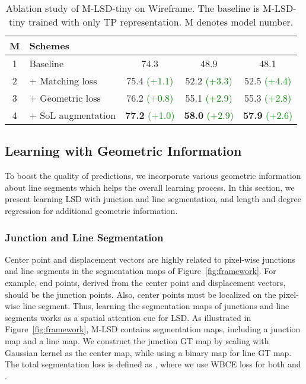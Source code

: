 \documentclass[letterpaper]{article} \usepackage{aaai22}  \usepackage{times}  \usepackage{helvet}  \usepackage{courier}  \usepackage[hyphens]{url}  \usepackage{graphicx} \urlstyle{rm} \def\UrlFont{\rm}  \usepackage{natbib}  \usepackage{caption} \DeclareCaptionStyle{ruled}{labelfont=normalfont,labelsep=colon,strut=off} \frenchspacing  \setlength{\pdfpagewidth}{8.5in}  \setlength{\pdfpageheight}{11in}  \usepackage{algorithm}
\begin{document}
\begin{table}[t!]
\centering
\begin{adjustbox}{width=1.0\columnwidth,center}
\begin{tabular}{clccc}
\toprule
M & Schemes                &  &  &  \\
\midrule
1 & Baseline    &   74.3   & 48.9  &  48.1  \\
2 & + Matching loss  &   75.4 \textcolor{Green}{(+1.1)}  & 52.2 \textcolor{Green}{(+3.3)}  &  52.5 \textcolor{Green}{(+4.4)} \\
3 & + Geometric loss     &   76.2 \textcolor{Green}{(+0.8)}  & 55.1 \textcolor{Green}{(+2.9)} &   55.3 \textcolor{Green}{(+2.8)}  \\
4 & + SoL augmentation      &   \textbf{77.2} \textcolor{Green}{(+1.0)}  & \textbf{58.0} \textcolor{Green}{(+2.9)} &   \textbf{57.9} \textcolor{Green}{(+2.6)}  \\
\bottomrule
\end{tabular}
\end{adjustbox}
\caption{Ablation study of M-LSD-tiny on Wireframe. The baseline is M-LSD-tiny trained with only TP representation. M denotes model number.}
\label{table:ablation}
\end{table}

\subsection{Learning with Geometric Information}
To boost the quality of predictions, we incorporate various geometric information about line segments which helps the overall learning process.
In this section, we present learning LSD with junction and line segmentation, and length and degree regression for additional geometric information.


\subsubsection{Junction and Line Segmentation}
Center point and displacement vectors are highly related to pixel-wise junctions and line segments in the segmentation maps of Figure~\ref{fig:framework}.
For example, end points, derived from the center point and displacement vectors, should be the junction points.
Also, center points must be localized on the pixel-wise line segment.
Thus, learning the segmentation maps of junctions and line segments works as a spatial attention cue for LSD.
As illustrated in Figure~\ref{fig:framework}, M-LSD contains segmentation maps, including a junction map and a line map.
We construct the junction GT map by scaling with Gaussian kernel as the center map, while using a binary map for line GT map.
The total segmentation loss is defined as , where we use WBCE loss for both  and .
\end{document}
